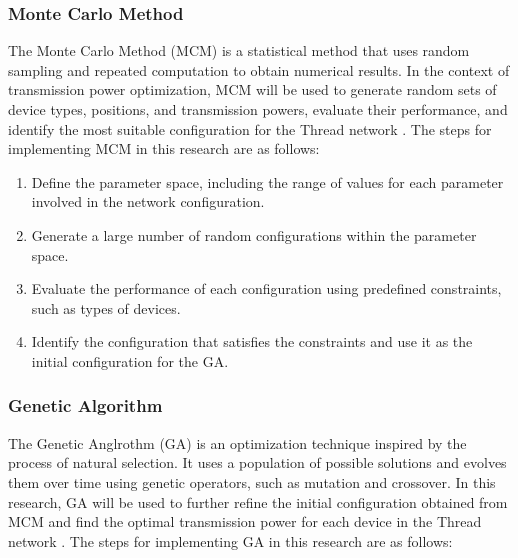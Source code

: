 \subsubsection{Monte Carlo Method}

The Monte Carlo Method (MCM) is a statistical method that uses random sampling and repeated computation to obtain numerical results. In the context of transmission power optimization, MCM will be used to generate random sets of device types, positions, and transmission powers, evaluate their performance, and identify the most suitable configuration for the Thread network \cite{kroese2014monte}. The steps for implementing MCM in this research are as follows:

\begin{enumerate}
    \item Define the parameter space, including the range of values for each parameter involved in the network configuration.
    \item Generate a large number of random configurations within the parameter space.
    \item Evaluate the performance of each configuration using predefined constraints, such as types of devices.
    \item Identify the configuration that satisfies the constraints and use it as the initial configuration for the GA.
\end{enumerate}

\subsubsection{Genetic Algorithm}

The Genetic Anglrothm (GA) is an optimization technique inspired by the process of natural selection. It uses a population of possible solutions and evolves them over time using genetic operators, such as mutation and crossover. In this research, GA will be used to further refine the initial configuration obtained from MCM and find the optimal transmission power for each device in the Thread network \cite{lambora2019genetic}. The steps for implementing GA in this research are as follows:

